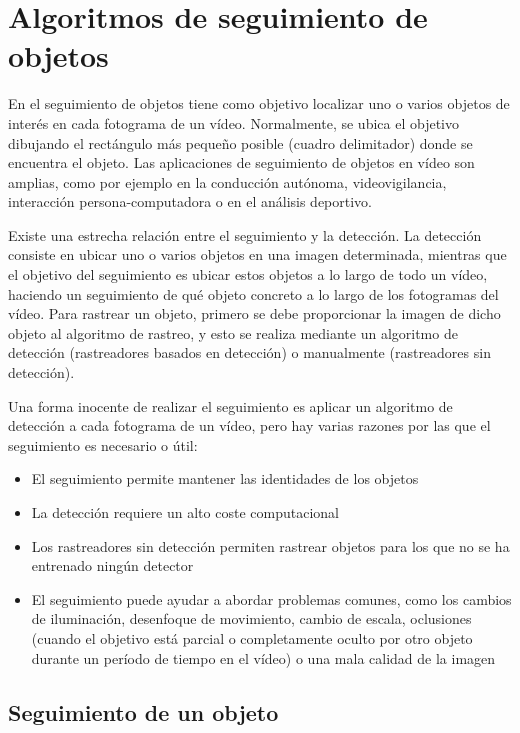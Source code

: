 \section{Algoritmos de seguimiento de objetos}
\label{sec:tecnicas-utilizadas-tracking}

En el seguimiento de objetos tiene como objetivo localizar uno o varios objetos de interés en cada fotograma de un vídeo. Normalmente, se ubica el objetivo dibujando el rectángulo más pequeño posible (cuadro delimitador) donde se encuentra el objeto. Las aplicaciones de seguimiento de objetos en vídeo son amplias, como por ejemplo en la conducción autónoma, videovigilancia, interacción persona-computadora o en el análisis deportivo.

Existe una estrecha relación entre el seguimiento y la detección. La detección consiste en ubicar uno o varios objetos en una imagen determinada, mientras que el objetivo del seguimiento es ubicar estos objetos a lo largo de todo un vídeo, haciendo un seguimiento de qué objeto concreto a lo largo de los fotogramas del vídeo. Para rastrear un objeto, primero se debe proporcionar la imagen de dicho objeto al algoritmo de rastreo, y esto se realiza mediante un algoritmo de detección (rastreadores basados en detección) o manualmente (rastreadores sin detección).

Una forma inocente de realizar el seguimiento es aplicar un algoritmo de detección a cada fotograma de un vídeo, pero hay varias razones por las que el seguimiento es necesario o útil:
\begin{itemize}
    \item El seguimiento permite mantener las identidades de los objetos
    \item La detección requiere un alto coste computacional
    \item Los rastreadores sin detección permiten rastrear objetos para los que no se ha entrenado ningún detector
    \item El seguimiento puede ayudar a abordar problemas comunes, como los  cambios de iluminación, desenfoque de movimiento, cambio de escala, oclusiones (cuando el objetivo está parcial o completamente oculto por otro objeto durante un período de tiempo en el vídeo) o una mala calidad de la imagen
\end{itemize}

\subsection{Seguimiento de un objeto}
\label{subsec:seguimiento-un-objeto}

